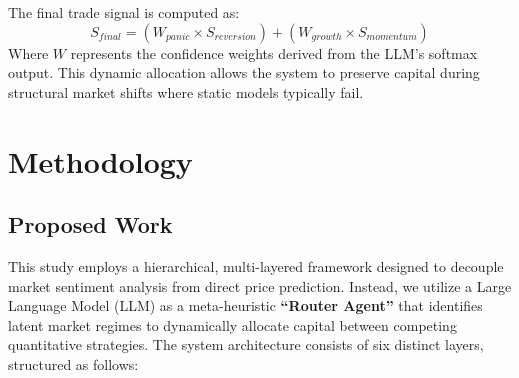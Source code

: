 \documentclass[12pt, a4paper]{report}
\begin{document}
The final trade signal is computed as:
\begin{equation}
    S_{final} = (W_{panic} \times S_{reversion}) + (W_{growth} \times S_{momentum})
\end{equation}
Where $W$ represents the confidence weights derived from the LLM's softmax output. This dynamic allocation allows the system to preserve capital during structural market shifts where static models typically fail.
\newpage
\chapter{Methodology}
\section{Proposed Work}
This study employs a hierarchical, multi-layered framework designed to decouple market sentiment analysis from direct price prediction. Instead, we utilize a Large Language Model (LLM) as a meta-heuristic \textbf{``Router Agent''} that identifies latent market regimes to dynamically allocate capital between competing quantitative strategies. The system architecture consists of six distinct layers, structured as follows:
\end{document}
